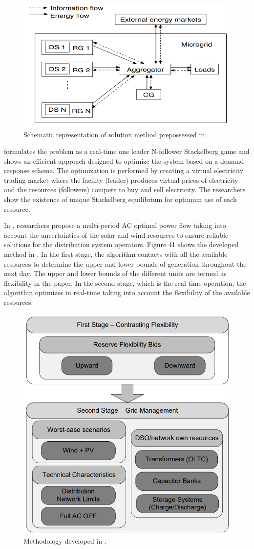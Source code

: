 \begin{figure}[!h]
\centering
\includegraphics[width=0.5\linewidth]{figs/RT_2.png}
\caption[Schematic representation of solution method prepossessed]{Schematic representation of solution method prepossessed in \cite{Sun14}.}
\label{fig:RT_2}
\end{figure}

\cite{Men16} formulates the problem as a real-time one leader N-follower Stackelberg game and shows an efficient approach designed to optimize the system based on a demand response scheme. The optimization is performed by creating a virtual electricity trading market where the facility (leader) produces virtual prices of electricity and the resources (followers) compete to buy and sell electricity. The researchers show the existence of unique Stackelberg equilibrium for optimum use of each resource.

In \cite{Tia17}, researchers propose a multi-period AC optimal power flow taking into account the uncertainties of the solar and wind resources to ensure reliable solutions for the distribution system operators. Figure 41 shows the developed method in \cite{Tia17}. In the first stage, the algorithm contacts with all the available resources to determine the upper and lower bounds of generation throughout the next day. The upper and lower bounds of the different units are termed as flexibility in the paper. In the second stage, which is the real-time operation, the algorithm optimizes in real-time taking into account the flexibility of the available resources. 
 
\begin{figure}[!h]
\centering
\includegraphics[width=0.4\linewidth]{figs/RT_3.png}
\caption[Methodology developed]{Methodology developed in \cite{Tia17}.}
\label{fig:RT_3}
\end{figure}

